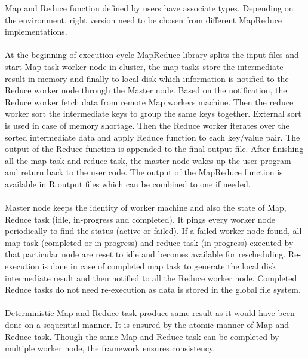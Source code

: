 \documentclass[8pt]{extarticle}
\begin{document}
Map and Reduce function defined by users have associate types. Depending on the environment, right version need to be chosen from different MapReduce implementations.

\paragraph{}
At the beginning of execution cycle MapReduce library splits the input files and start Map task worker node in cluster, the map tasks store the intermediate result in memory and finally to local disk  which information is notified to the Reduce worker node through the Master node. Based on the notification, the Reduce worker fetch data from remote Map workers machine. Then the reduce worker sort the intermediate keys to group the same keys together. External sort is used in case of memory shortage. Then the Reduce worker iterates over the sorted intermediate data and apply Reduce function to each key/value pair. The output of the Reduce function is appended to the final output file. After finishing all the map task and reduce task, the master node wakes up the user program and return back to the user code. The output of the MapReduce function is available in R output files which can be combined to one if needed.

\paragraph{}
Master node keeps the identity of worker machine and also the state of Map, Reduce task (idle, in-progress and completed). It pings every worker node periodically to find the status (active or failed). If a failed worker node found, all map task (completed or in-progress) and reduce task (in-progress) executed by that particular node are reset to idle and becomes available for rescheduling. Re-execution is done in case of completed map task to generate the local disk intermediate result and then notified to all the Reduce worker node. Completed Reduce tasks do not need re-execution as data is stored in the global file system.

\paragraph{}
Deterministic Map and Reduce task produce same result as it would have been done on a sequential manner. It is ensured by the atomic manner of Map and Reduce task. Though the same Map and Reduce task can be completed by multiple worker node, the framework ensures consistency.
\end{document}
